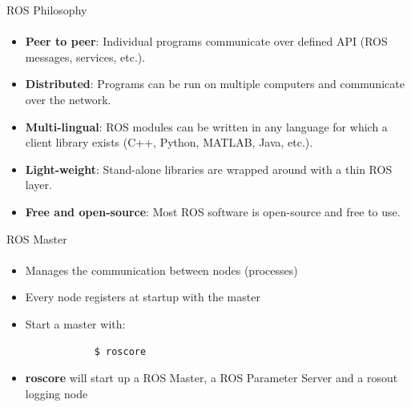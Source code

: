 \documentclass{beamer}
\begin{document}
\begin{frame}{ROS Philosophy}
	\framesubtitle{}
	\begin{itemize}
		
		\item \textbf{Peer to peer}: Individual programs communicate over defined API (ROS messages, services, etc.).
		\item \textbf{Distributed}: Programs can be run on multiple computers and communicate over the network.
		\item \textbf{Multi-lingual}: ROS modules can be written in any language for which a client library exists (C++, Python, MATLAB, Java, etc.).
		\item \textbf{Light-weight}: Stand-alone libraries are wrapped around with a thin ROS layer.
		\item \textbf{Free and open-source}: Most ROS software is open-source and free to use.

	\end{itemize}
\end{frame}

\begin{frame}[fragile]{ROS Master}
	\framesubtitle{ }
	\begin{minipage}{0.47\textwidth}
    \begin{itemize}
        \item Manages the communication between nodes (processes)
        \item Every node registers at startup with the master
    \end{itemize}
	
	\vspace{0.3in}

	\begin{itemize}
		\item Start a master with:

		\begin{lstlisting}
			$ roscore
		\end{lstlisting}

		\item \textbf{roscore} will start up a ROS Master, a ROS Parameter Server and a rosout logging node
		\end{itemize}

	

\end{minipage}
\begin{minipage}{0.5\textwidth}
	
\end{minipage}
\end{frame}
\end{document}
